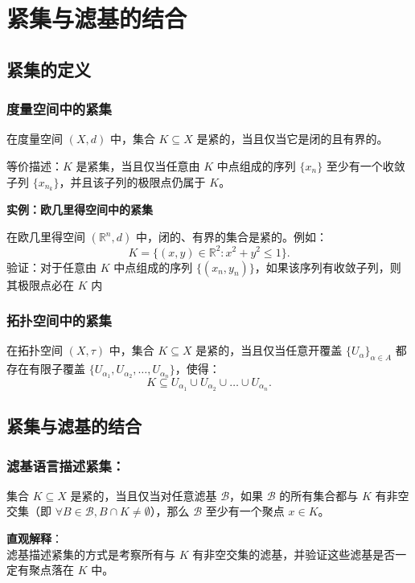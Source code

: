 \documentclass[a4paper, oneside]{article}
\begin{document}
\section{紧集与滤基的结合}

\subsection{紧集的定义}

\subsubsection{度量空间中的紧集}

在度量空间 $(X, d)$ 中，集合 $K \subseteq X$ 是紧的，当且仅当它是闭的且有界的。

等价描述：$K$ 是紧集，当且仅当任意由 $K$ 中点组成的序列 $\{x_n\}$ 至少有一个收敛子列 $\{x_{n_k}\}$，并且该子列的极限点仍属于 $K$。

\textbf{实例：欧几里得空间中的紧集}

在欧几里得空间 $(\mathbb{R}^n, d)$ 中，闭的、有界的集合是紧的。例如：
\[
K = \{(x, y) \in \mathbb{R}^2 : x^2 + y^2 \leq 1\}.
\]
验证：对于任意由 $K$ 中点组成的序列 $\{(x_n, y_n)\}$，如果该序列有收敛子列，则其极限点必在 $K$ 内

\subsubsection{拓扑空间中的紧集}

在拓扑空间 $(X, \tau)$ 中，集合 $K \subseteq X$ 是紧的，当且仅当任意开覆盖 $\{U_\alpha\}_{\alpha \in A}$ 都存在有限子覆盖 $\{U_{\alpha_1}, U_{\alpha_2}, \dots, U_{\alpha_n}\}$，使得：
\[
K \subseteq U_{\alpha_1} \cup U_{\alpha_2} \cup \dots \cup U_{\alpha_n}.
\]

\subsection{紧集与滤基的结合}

\subsubsection{滤基语言描述紧集：}

集合 $K \subseteq X$ 是紧的，当且仅当对任意滤基 $\mathcal{B}$，如果 $\mathcal{B}$ 的所有集合都与 $K$ 有非空交集（即 $\forall B \in \mathcal{B}, B \cap K \neq \emptyset$），那么 $\mathcal{B}$ 至少有一个聚点 $x \in K$。

\textbf{直观解释}：\\
滤基描述紧集的方式是考察所有与 $K$ 有非空交集的滤基，并验证这些滤基是否一定有聚点落在 $K$ 中。
\end{document}
